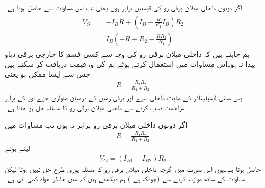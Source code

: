 اگر دونوں داخلی میلان برقی رو کی قیمتیں برابر ہوں یعنی  تب اس مساوات سے حاصل ہوتا ہے۔
\begin{gather}
\begin{aligned}
 V_O&=-I_B R + \left (I_B-\frac{R}{R_1}I_B \right ) R_2\\
&=I_B \left (-R+R_2-\frac{R R_2}{R_1} \right ) 
\end{aligned}
\end{gather}
ہم چاہتے ہیں کہ داخلی میلان برقی رو کی وجہ سے کسی قسم کا خارجی برقی دباو پیدا نہ ہو۔اس مساوات میں  استعمال کرتے ہوئے ہم  کی وہ قیمت دریافت کر سکتے ہیں جس سے ایسا ممکن ہو یعنی
\begin{align}
R=\frac{R_1 R_2}{R_1+R_2}
\end{align}
پس منفی ایمپلیفائر کے مثبت داخلی سرے  اور برقی زمین کے درمیان متوازی جڑے  اور  کے برابر مزاحمت نسب کرنے سے داخلی  میلان برقی رو کا مسئلہ حل ہو جاتا ہے۔

اگر دونوں داخلی میلان برقی رو برابر نہ ہوں تب مساوات   میں 
\begin{align*}
R=\frac{R_1 R_2}{R_1+R_2}
\end{align*}
لیتے ہوئے
\begin{align}
V_O=\left (I_{B1}-I_{B2} \right )R_2
\end{align}
حاصل ہوتا ہے۔یوں اس صورت میں اگرچہ داخلی میلان برقی رو کا مسئلہ پوری طرح حل نہیں ہوتا لیکن مساوات   کے ساتھ موازنہ کرنے سے (چونکہ  ہے ) ہم دیکھتے ہیں کہ   میں خاطر خواہ کمی آتی ہے۔



